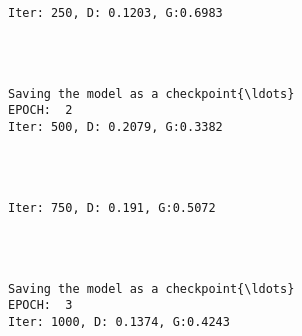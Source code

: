 \documentclass[11pt]{article}
\begin{document}
    \begin{Verbatim}[commandchars=\\\{\}]

Iter: 250, D: 0.1203, G:0.6983
    \end{Verbatim}

    \begin{center}
    \end{center}
    { \hspace*{\fill} \\}
    
    \begin{Verbatim}[commandchars=\\\{\}]

Saving the model as a checkpoint{\ldots}
EPOCH:  2
Iter: 500, D: 0.2079, G:0.3382
    \end{Verbatim}

    \begin{center}
    \end{center}
    { \hspace*{\fill} \\}
    
    \begin{Verbatim}[commandchars=\\\{\}]

Iter: 750, D: 0.191, G:0.5072
    \end{Verbatim}

    \begin{center}
    \end{center}
    { \hspace*{\fill} \\}
    
    \begin{Verbatim}[commandchars=\\\{\}]

Saving the model as a checkpoint{\ldots}
EPOCH:  3
Iter: 1000, D: 0.1374, G:0.4243
    \end{Verbatim}

    \begin{center}
    \end{center}
    { \hspace*{\fill} \\}
    
\end{document}
